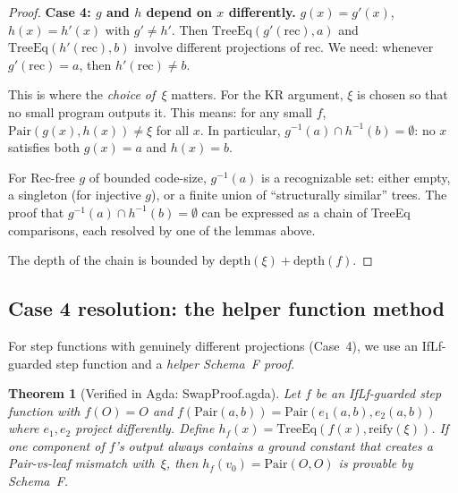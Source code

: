 \documentclass[11pt]{article}
\newtheorem{theorem}{Theorem}
\begin{document}
\begin{proof}
\textbf{Case 4: $g$ and $h$ depend on $x$ differently.}
$g(x) = g'(x)$, $h(x) = h'(x)$ with $g' \neq h'$.
Then $\mathrm{TreeEq}(g'(\mathrm{rec}), a)$ and $\mathrm{TreeEq}(h'(\mathrm{rec}), b)$
involve different projections of $\mathrm{rec}$. We need:
whenever $g'(\mathrm{rec}) = a$, then $h'(\mathrm{rec}) \neq b$.

This is where the \emph{choice of~$\xi$} matters. For the KR argument, $\xi$ is chosen
so that no small program outputs it. This means: for any small $f$,
$\mathrm{Pair}(g(x), h(x)) \neq \xi$ for all $x$. In particular,
$g^{-1}(a) \cap h^{-1}(b) = \emptyset$: no $x$ satisfies both $g(x) = a$ and $h(x) = b$.

For Rec-free $g$ of bounded code-size, $g^{-1}(a)$ is a recognizable set:
either empty, a singleton (for injective $g$), or a finite union of ``structurally similar'' trees.
The proof that $g^{-1}(a) \cap h^{-1}(b) = \emptyset$ can be expressed as a chain of
TreeEq comparisons, each resolved by one of the lemmas above.

The depth of the chain is bounded by $\mathrm{depth}(\xi) + \mathrm{depth}(f)$.
\end{proof}

\subsection{Case 4 resolution: the helper function method}

For step functions with genuinely different projections (Case~4),
we use an IfLf-guarded step function and a \emph{helper Schema~F proof}.

\begin{theorem}[Verified in Agda: SwapProof.agda]
Let $f$ be an IfLf-guarded step function with $f(O) = O$ and
$f(\mathrm{Pair}(a,b)) = \mathrm{Pair}(e_1(a,b), e_2(a,b))$ where $e_1, e_2$
project differently. Define $h_f(x) = \mathrm{TreeEq}(f(x), \mathrm{reify}(\xi))$.
If one component of $f$'s output always contains a ground constant
that creates a Pair-vs-leaf mismatch with~$\xi$, then $h_f(v_0) = \mathrm{Pair}(O,O)$
is provable by Schema~F.
\end{theorem}
\end{document}
